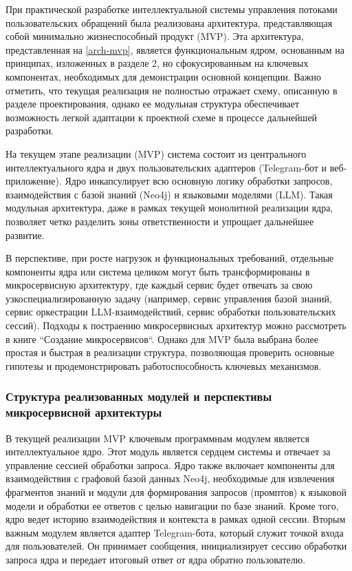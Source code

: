 При практической разработке интеллектуальной системы управления потоками пользовательских обращений была реализована архитектура, представляющая собой минимально жизнеспособный продукт (MVP). Эта архитектура, представленная на \ref{arch-mvp}, является функциональным ядром, основанным на принципах, изложенных в разделе 2, но сфокусированным на ключевых компонентах, необходимых для демонстрации основной концепции. Важно отметить, что текущая реализация не полностью отражает схему, описанную в разделе проектирования, однако ее модульная структура обеспечивает возможность легкой адаптации к проектной схеме в процессе дальнейшей разработки.


На текущем этапе реализации (MVP) система состоит из центрального интеллектуального ядра и двух пользовательских адаптеров (Telegram-бот и веб-приложение). Ядро инкапсулирует всю основную логику обработки запросов, взаимодействия с базой знаний (Neo4j) и языковыми моделями (LLM). Такая модульная архитектура, даже в рамках текущей монолитной реализации ядра, позволяет четко разделить зоны ответственности и упрощает дальнейшее развитие.

В перспективе, при росте нагрузок и функциональных требований, отдельные компоненты ядра или система целиком могут быть трансформированы в микросервисную архитектуру, где каждый сервис будет отвечать за свою узкоспециализированную задачу (например, сервис управления базой знаний, сервис оркестрации LLM-взаимодействий, сервис обработки пользовательских сессий). Подходы к постраению микросервисных архитектур можно рассмотреть в книге ``Создание микросервисов``\cite{Newman2015}. Однако для MVP была выбрана более простая и быстрая в реализации структура, позволяющая проверить основные гипотезы и продемонстрировать работоспособность ключевых механизмов.

\subsubsection{Структура реализованных модулей и перспективы микросервисной архитектуры}

В текущей реализации MVP ключевым программным модулем является интеллектуальное ядро. Этот модуль является сердцем системы и отвечает за управление сессией обработки запроса. Ядро также включает компоненты для взаимодействия с графовой базой данных Neo4j, необходимые для извлечения фрагментов знаний и модули для формирования запросов (промптов) к языковой модели и обработки ее ответов с целью навигации по базе знаний. Кроме того, ядро ведет историю взаимодействия и контекста в рамках одной сессии. Вторым важным модулем является адаптер Telegram-бота, который служит точкой входа для пользователей. Он принимает сообщения, инициализирует сессию обработки запроса ядра и передает итоговый ответ от ядра обратно пользователю.

